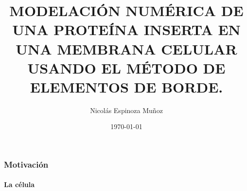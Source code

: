 \documentclass[usenames,dvipsnames,notitlepage]{beamer}
\author{Nicolás Espinoza Muñoz}
\title{MODELACIÓN NUMÉRICA DE UNA PROTEÍNA INSERTA EN UNA MEMBRANA CELULAR USANDO EL MÉTODO DE ELEMENTOS DE BORDE.}
\institute{UNIVERSIDAD TÉCNICA FEDERICO SANTA MARÍA}
\date{\today}
\begin{document}
\begin{frame}[plain]
\maketitle
\end{frame}

\begin{frame}
\frametitle{Motivación}
\framesubtitle{La célula}
\end{frame}
\end{document}
